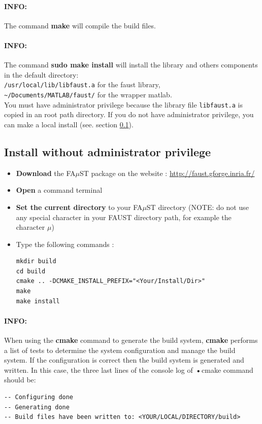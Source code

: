 \paragraph{INFO:}The command \textbf{make} will compile the build files.

\paragraph{INFO:}The command \textbf{sudo make install} will install the library and others components in the default directory: \\
\texttt{/usr/local/lib/libfaust.a} for the faust library, \\
\texttt{\textasciitilde /Documents/MATLAB/faust/} for the wrapper matlab.
\\
You must have administrator privilege because the library file \texttt{libfaust.a} is copied in an root path directory. If you do not have administrator privilege, you can make a local install (see. section \ref{sec:UnixBuildInstallNOAdmin}).

\subsection{Install without administrator privilege}\label{sec:UnixBuildInstallNOAdmin}

\begin{itemize}
\item \textbf{Download} the FA$\mu$ST package on the website :  \url{http://faust.gforge.inria.fr/}
\item \textbf{Open} a command terminal
\item \textbf{Set the current directory} to your FA$\mu$ST directory (NOTE: do not use any special character in your FAUST directory path, for example the character $\mu$)
\item Type the following commands : 
\begin{lstlisting}
mkdir build
cd build
cmake .. -DCMAKE_INSTALL_PREFIX="<Your/Install/Dir>"
make
make install
\end{lstlisting}
\end{itemize}

\paragraph{INFO:}When using the \textbf{cmake} command to generate the build system, \textbf{cmake} performs a list of tests to determine the system configuration and manage the build system. If the configuration is correct then the build system is generated and written. In this case, the three last lines of the console log of \textbf{•}{cmake} command should be: \begin{lstlisting}
-- Configuring done 
-- Generating done
-- Build files have been written to: <YOUR/LOCAL/DIRECTORY/build>
\end{lstlisting}

